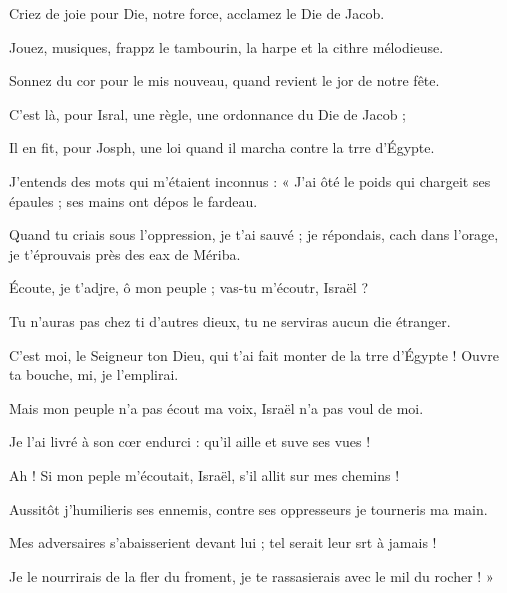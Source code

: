 \item Criez de joie pour Die, notre force, acclamez le Die de Jacob.
\item Jouez, musiques, frappz le tambourin, la harpe et la cithre mélodieuse.
\item Sonnez du cor pour le mis nouveau, quand revient le jor de notre fête.
\item C’est là, pour Isral, une règle, une ordonnance du Die de Jacob ;
\item Il en fit, pour Josph, une loi quand il marcha contre la trre d’Égypte.
\item J’entends des mots qui m’étaient inconnus : « J’ai ôté le poids qui chargeit ses épaules ; ses mains ont dépos le fardeau.
\item Quand tu criais sous l’oppression, je t’ai sauvé ; je répondais, cach dans l’orage, je t’éprouvais près des eax de Mériba.
\item Écoute, je t’adjre, ô mon peuple ; vas-tu m’écoutr, Israël ?
\item Tu n’auras pas chez ti d’autres dieux, tu ne serviras aucun die étranger.
\item C’est moi, le Seigneur ton Dieu, qui t’ai fait monter de la trre d’Égypte ! Ouvre ta bouche, mi, je l’emplirai.
\item Mais mon peuple n’a pas écout ma voix, Israël n’a pas voul de moi.
\item Je l’ai livré à son cœr endurci : qu’il aille et suve ses vues !
\item Ah ! Si mon peple m’écoutait, Israël, s’il allit sur mes chemins !
\item Aussitôt j’humilieris ses ennemis, contre ses oppresseurs je tourneris ma main.
\item Mes adversaires s’abaisserient devant lui ; tel serait leur srt à jamais !
\item Je le nourrirais de la fler du froment, je te rassasierais avec le mil du rocher ! »
